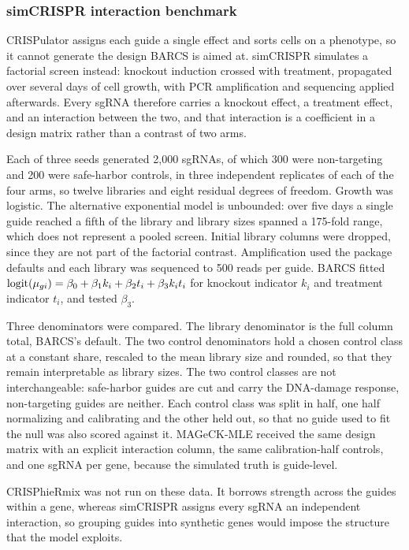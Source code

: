 \subsubsection{simCRISPR interaction benchmark}

CRISPulator assigns each guide a single effect and sorts cells on a
phenotype, so it cannot generate the design BARCS is aimed at.  simCRISPR
\citep{zhu2026simcrispr} simulates a factorial screen instead: knockout
induction crossed with treatment, propagated over several days of cell
growth, with PCR amplification and sequencing applied afterwards.  Every
sgRNA therefore carries a knockout effect, a treatment effect, and an
interaction between the two, and that interaction is a coefficient in a
design matrix rather than a contrast of two arms.

Each of three seeds generated 2,000 sgRNAs, of which 300 were non-targeting
and 200 were safe-harbor controls, in three independent replicates of each of
the four arms, so twelve libraries and eight residual degrees of freedom.
Growth was logistic.  The alternative exponential model is unbounded: over
five days a single guide reached a fifth of the library and library sizes
spanned a 175-fold range, which does not represent a pooled screen.  Initial
library columns were dropped, since they are not part of the factorial
contrast.  Amplification used the package defaults and each library was
sequenced to 500 reads per guide.  BARCS fitted
$\operatorname{logit}(\mu_{gi})=\beta_0+\beta_1 k_i+\beta_2 t_i+\beta_3 k_i t_i$
for knockout indicator $k_i$ and treatment indicator $t_i$, and tested
$\beta_3$.

Three denominators were compared.  The library denominator is the full column
total, BARCS's default.  The two control denominators hold a chosen control
class at a constant share, rescaled to the mean library size and rounded, so
that they remain interpretable as library sizes.  The two control classes are
not interchangeable: safe-harbor guides are cut and carry the DNA-damage
response, non-targeting guides are neither.  Each control class was split in
half, one half normalizing and calibrating and the other held out, so that no
guide used to fit the null was also scored against it.  MAGeCK-MLE received
the same design matrix with an explicit interaction column, the same
calibration-half controls, and one sgRNA per gene, because the simulated truth
is guide-level.

CRISPhieRmix was not run on these data.  It borrows strength across the guides
within a gene, whereas simCRISPR assigns every sgRNA an independent
interaction, so grouping guides into synthetic genes would impose the structure
that the model exploits.

